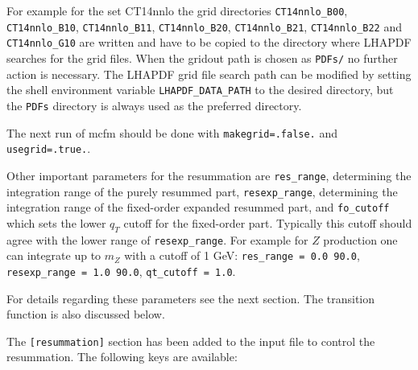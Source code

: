 For example for the set CT14nnlo the grid directories
\texttt{CT14nnlo\_B00}, \texttt{CT14nnlo\_B10}, \texttt{CT14nnlo\_B11},
\texttt{CT14nnlo\_B20}, \texttt{CT14nnlo\_B21}, \texttt{CT14nnlo\_B22} and \texttt{CT14nnlo\_G10} 
are written and have to be copied to the
directory where LHAPDF searches for the grid files. When the gridout path is chosen as 
\texttt{PDFs/} no further action is necessary. The LHAPDF grid file
search path can be modified by setting the shell
environment variable \texttt{LHAPDF\_DATA\_PATH} to the desired
directory, but the \texttt{PDFs} directory is always used as the preferred directory.


The next run of mcfm should be done with \texttt{makegrid=.false.} and \texttt{usegrid=.true.}.

Other important parameters for the resummation are \texttt{res\_range},
determining the integration range of the purely resummed part,
\texttt{resexp\_range}, determining the integration range of the
fixed-order expanded resummed part, and \texttt{fo\_cutoff} which sets
the lower $q_T$ cutoff for the fixed-order part. Typically this cutoff
should agree with the lower range of \texttt{resexp\_range}. For example
for $Z$ production one can integrate up to $m_Z$ with a cutoff of 1 GeV: \texttt{res\_range = 
0.0 90.0},
\texttt{resexp\_range = 1.0 90.0}, \texttt{qt\_cutoff = 1.0}.

For details regarding these parameters see the next section. The
transition function is also discussed below.

\hypertarget{input-file-parameters}{%
	\label{input-file-parameters}}

The \texttt{[resummation]} section has been added to the input file to
control the resummation. The following keys are available:

